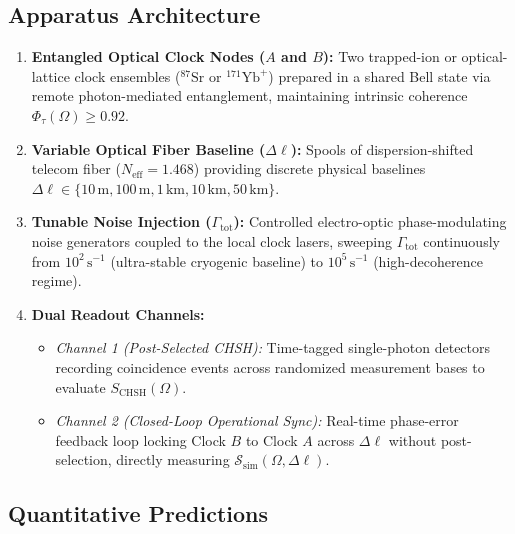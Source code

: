 \documentclass[11pt,a4paper]{article}
\begin{document}
\subsection{Apparatus Architecture}
\begin{enumerate}
    \item \textbf{Entangled Optical Clock Nodes ($A$ and $B$):} Two trapped-ion or optical-lattice clock ensembles ($^{87}\mathrm{Sr}$ or $^{171}\mathrm{Yb}^+$) prepared in a shared Bell state via remote photon-mediated entanglement, maintaining intrinsic coherence $\Phi_\tau(\Omega) \ge 0.92$.
    \item \textbf{Variable Optical Fiber Baseline ($\Delta\ell$):} Spools of dispersion-shifted telecom fiber ($N_{\mathrm{eff}} = 1.468$) providing discrete physical baselines $\Delta\ell \in \{10\,\mathrm{m}, 100\,\mathrm{m}, 1\,\mathrm{km}, 10\,\mathrm{km}, 50\,\mathrm{km}\}$.
    \item \textbf{Tunable Noise Injection ($\Gamma_{\mathrm{tot}}$):} Controlled electro-optic phase-modulating noise generators coupled to the local clock lasers, sweeping $\Gamma_{\mathrm{tot}}$ continuously from $10^2\,\mathrm{s}^{-1}$ (ultra-stable cryogenic baseline) to $10^5\,\mathrm{s}^{-1}$ (high-decoherence regime).
    \item \textbf{Dual Readout Channels:}
    \begin{itemize}
        \item \emph{Channel 1 (Post-Selected CHSH):} Time-tagged single-photon detectors recording coincidence events across randomized measurement bases to evaluate $S_{\mathrm{CHSH}}(\Omega)$.
        \item \emph{Channel 2 (Closed-Loop Operational Sync):} Real-time phase-error feedback loop locking Clock $B$ to Clock $A$ across $\Delta\ell$ without post-selection, directly measuring $\mathcal{S}_{\mathrm{sim}}(\Omega, \Delta\ell)$.
    \end{itemize}
\end{enumerate}

\subsection{Quantitative Predictions}
\end{document}
